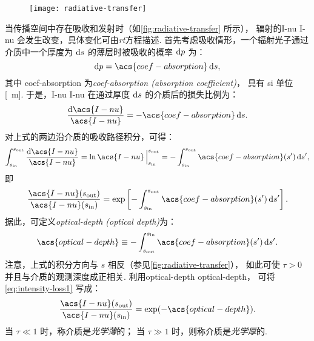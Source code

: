 \begin{figure}[htp]
  \centering
  \texttt{[image: radiative-transfer]}
  \label{fig:radiative-transfer}
\end{figure}

当传播空间中存在吸收和发射时（如\autoref{fig:radiative-transfer} 所示），
辐射的\acl{I-nu} \acs{I-nu} 会发生改变，具体变化可由\emph{\acf{rt}}方程描述.
首先考虑吸收情形，一个辐射光子通过介质中一个厚度为 $\mathrm{d}s$ 的薄层时被吸收的概率 $\mathrm{d}p$ 为：
\begin{equation}
  \D{p} = \acs{coef-absorption} \,\D{s} ,
\end{equation}
其中 \acs{coef-absorption}
为\emph{\acl{coef-absorption} (absorption coefficient)}，
具有 \ac{si} 单位 [\si{\per\meter}].
于是，\acl{I-nu} \acs{I-nu} 在通过厚度 $\mathrm{d}s$ 的介质后的损失比例为：
\begin{equation}
  \label{eq:rt-absorption}
  \frac{\D{\acs{I-nu}}}{\acs{I-nu}} = - \acs{coef-absorption} \,\D{s} .
\end{equation}
对上式的两边沿介质的吸收路径积分，可得：
\begin{equation}
  \int_{s_{\R{in}}}^{s_{\R{out}}} \frac{\D{\acs{I-nu}}}{\acs{I-nu}}
    = \ln\acs{I-nu} \,\Big|_{s_{\R{in}}}^{s_{\R{out}}}
    = - \int_{s_{\R{in}}}^{s_{\R{out}}} \acs{coef-absorption}(s') \,\D{s'} ,
\end{equation}
即
\begin{equation}
  \label{eq:intensity-loss1}
  \frac{\acs{I-nu}(s_{\R{out}})}{\acs{I-nu}(s_{\R{in}})} =
    \exp \left[ - \int_{s_{\R{in}}}^{s_{\R{out}}}
      \acs{coef-absorption}(s') \,\D{s'} \right] .
\end{equation}
据此，可定义\emph{\acl{optical-depth} (optical depth)}为：
\begin{equation}
  \label{eq:optical-depth}
  \acs{optical-depth} \equiv
    - \int_{s_{\R{out}}}^{s_{\R{in}}} \acs{coef-absorption}(s') \,\D{s'} .
\end{equation}
注意，上式的积分方向与 $s$ 相反（参见\autoref{fig:radiative-transfer}），
如此可使 $\tau > 0$ 并且与介质的观测深度成正相关.
利用\acl{optical-depth} \acs{optical-depth}，
可将\autoref{eq:intensity-loss1} 写成：
\begin{equation}
  \label{eq:intensity-loss}
  \frac{\acs{I-nu}(s_{\R{out}})}{\acs{I-nu}(s_{\R{in}})} =
    \exp (-\acs{optical-depth}) .
\end{equation}
当 $\tau \ll 1$ 时，称介质是\emph{光学薄}的；
当 $\tau \gg 1$ 时，则称介质是\emph{光学厚}的.

